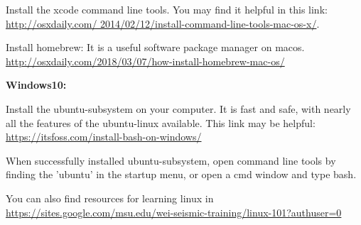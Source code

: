 \documentclass[12pt]{article}   	%
\begin{document}
Install the xcode command line tools.  You may find it helpful in this link: \href{http://osxdaily.com/2014/02/12/install-command-line-tools-mac-os-x/}{http://osxdaily.com/ 2014/02/12/install-command-line-tools-mac-os-x/}. 

Install homebrew: It is a useful software package manager on macos.  \href{http://osxdaily.com/2018/03/07/how-install-homebrew-mac-os/}{http://osxdaily.com/2018/03/07/how-install-homebrew-mac-os/}

\textbf{Windows10:}

Install the ubuntu-subsystem on your computer. It is fast and safe, with nearly all the features of the ubuntu-linux available. This link may be helpful: \href{https://itsfoss.com/install-bash-on-windows/}{https://itsfoss.com/install-bash-on-windows/}

When successfully installed ubuntu-subsystem, open command line tools by finding the 'ubuntu' in the startup menu, or open a cmd window and type bash.

You can also find resources for learning linux in \href{https://sites.google.com/msu.edu/wei-seismic-training/linux-101?authuser=0}{https://sites.google.com/msu.edu/wei-seismic-training/linux-101?authuser=0}
\end{document}
